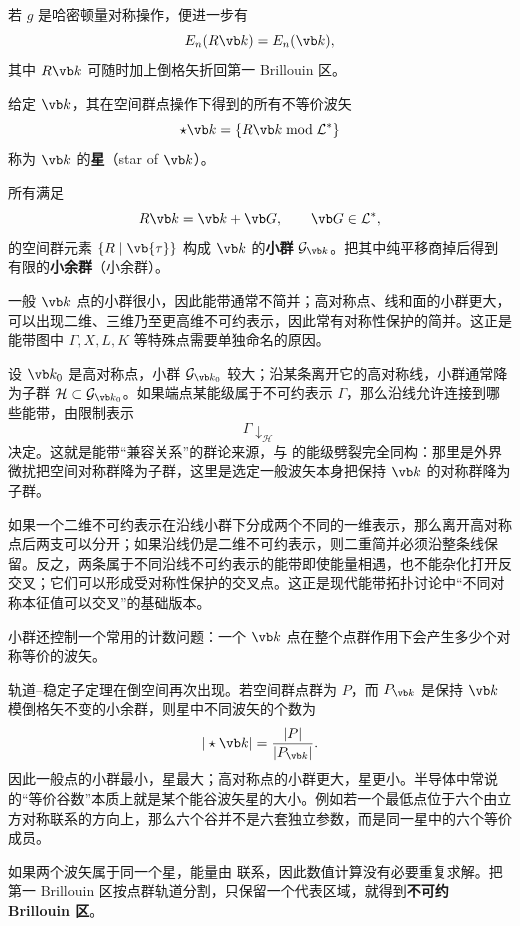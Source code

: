 若 $g$ 是哈密顿量对称操作，便进一步有
\[
E_n(R\vb k)=E_n(\vb k),
\label{eq:band-star-degeneracy}
\]
其中 $R\vb k$ 可随时加上倒格矢折回第一 Brillouin 区。

\begin{definition}[波矢的星与小群]
给定 $\vb k$，其在空间群点操作下得到的所有不等价波矢
\[
\star\vb k
=\{R\vb k\bmod\mathcal L^*\}
\]
称为 $\vb k$ 的\textbf{星}（star of $\vb k$）。

所有满足
\[
R\vb k=\vb k+\vb G,
\qquad \vb G\in\mathcal L^*,
\]
的空间群元素 $\{R\mid\vb{\tau}\}$ 构成 $\vb k$ 的\textbf{小群} $\mathcal G_{\vb k}$。把其中纯平移商掉后得到有限的\textbf{小余群}（小余群）。
\label{def:star-little-group}
\end{definition}

一般 $\vb k$ 点的小群很小，因此能带通常不简并；高对称点、线和面的小群更大，可以出现二维、三维乃至更高维不可约表示，因此常有对称性保护的简并。这正是能带图中 $\Gamma,X,L,K$ 等特殊点需要单独命名的原因。

设 $\vb k_0$ 是高对称点，小群 $\mathcal G_{\vb k_0}$ 较大；沿某条离开它的高对称线，小群通常降为子群 $\mathcal H\subset\mathcal G_{\vb k_0}$。如果端点某能级属于不可约表示 $\Gamma$，那么沿线允许连接到哪些能带，由限制表示
\[
\Gamma\downarrow_{\mathcal H}
\]
决定。这就是能带“兼容关系”的群论来源，与  的能级劈裂完全同构：那里是外界微扰把空间对称群降为子群，这里是选定一般波矢本身把保持 $\vb k$ 的对称群降为子群。

如果一个二维不可约表示在沿线小群下分成两个不同的一维表示，那么离开高对称点后两支可以分开；如果沿线仍是二维不可约表示，则二重简并必须沿整条线保留。反之，两条属于不同沿线不可约表示的能带即使能量相遇，也不能杂化打开反交叉；它们可以形成受对称性保护的交叉点。这正是现代能带拓扑讨论中“不同对称本征值可以交叉”的基础版本。

小群还控制一个常用的计数问题：一个 $\vb k$ 点在整个点群作用下会产生多少个对称等价的波矢。

轨道--稳定子定理在倒空间再次出现。若空间群点群为 $P$，而 $P_{\vb k}$ 是保持 $\vb k$ 模倒格矢不变的小余群，则星中不同波矢的个数为
\[
|\star\vb k|=\frac{|P|}{|P_{\vb k}|}.
\label{eq:k-star-size}
\]
因此一般点的小群最小，星最大；高对称点的小群更大，星更小。半导体中常说的“等价谷数”本质上就是某个能谷波矢星的大小。例如若一个最低点位于六个由立方对称联系的方向上，那么六个谷并不是六套独立参数，而是同一星中的六个等价成员。

如果两个波矢属于同一个星，能量由  联系，因此数值计算没有必要重复求解。把第一 Brillouin 区按点群轨道分割，只保留一个代表区域，就得到\textbf{不可约 Brillouin 区}。

